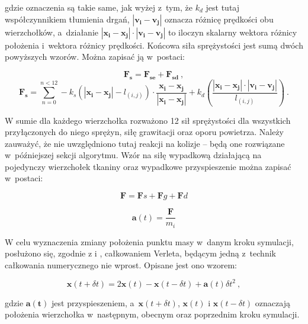 			gdzie oznaczenia są takie same, jak wyżej z~tym, że \(k_{d}\) jest tutaj współczynnikiem tłumienia drgań, \(|\mathbf{v_{i}} - \mathbf{v_{j}}|\) oznacza różnicę prędkości obu wierzchołków, a~działanie \(|\mathbf{x_{i}} - \mathbf{x_{j}}| \cdot |\mathbf{v_{i}} - \mathbf{v_{j}}|\) to iloczyn skalarny wektora różnicy położenia i~wektora różnicy prędkości. Końcowa siła sprężystości jest sumą dwóch powyższych wzorów. Można zapisać ją w~postaci:
			
			\begin{equation}
			\mathbf{F_{s}} = \mathbf{F_{se}} + \mathbf{F_{sd}} \ ,
			\end{equation}
			\begin{equation}
			\mathbf{F_{s}} = \sum_{n = 0}^{n < 12} - k_{s} (|\mathbf{x_{i}} - \mathbf{x_{j}}| - l_{(i, j)}) \cdot \frac{\mathbf{x_{i}} - \mathbf{x_{j}}}{|\mathbf{x_{i}} - \mathbf{x_{j}}|} + k_{d}(\frac{|\mathbf{x_{i}} - \mathbf{x_{j}}| \cdot |\mathbf{v_{i}} - \mathbf{v_{j}}|}{l_{(i, j)}}) \ .
			\end{equation}
			
			W sumie dla każdego wierzchołka rozważono 12 sił sprężystości dla wszystkich przyłączonych do niego sprężyn, siłę grawitacji oraz oporu powietrza. Należy zauważyć, że nie uwzględniono tutaj reakcji na kolizje -- będą one rozwiązane w~późniejszej sekcji algorytmu. Wzór na siłę wypadkową działającą na pojedynczy wierzchołek tkaniny oraz wypadkowe przyspieszenie można zapisać w~postaci:
			
			\begin{equation}
			\mathbf{F} = \mathbf{F}{s} + \mathbf{F}{g} + \mathbf{F}{d}		
			\end{equation}
			
			\begin{equation}
			\mathbf{a}(t) = \frac{\mathbf{F}}{m_{i}}	
			\end{equation}
			
			W celu wyznaczenia zmiany położenia punktu masy w~danym kroku symulacji, posłużono się, zgodnie z \cite{cloth-dobre-wzory} i \cite{receptury}, całkowaniem Verleta, będącym jedną z~technik całkowania numerycznego nie wprost. Opisane jest ono wzorem:
			
			\begin{equation}
			\mathbf{x}(t + \delta t) = 2\mathbf{x}(t) - \mathbf{x}(t - \delta t) + \mathbf{a}(t) \delta t^{2} \ ,		
			\end{equation}
			
			gdzie \(\mathbf{a(t)}\) jest przyspieszeniem, a~\(\mathbf{x}(t + \delta t)\), \(\mathbf{x}(t)\) i \(\mathbf{x}(t - \delta t)\) oznaczają położenia wierzchołka w~następnym, obecnym oraz poprzednim kroku symulacji. 
			
